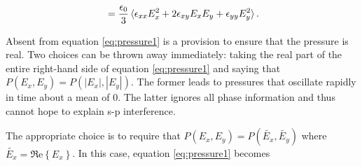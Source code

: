 \documentclass[aps, prl, twocolumn, groupedaddress]{revtex4-1}
\begin{document}
\begin{equation}
\begin{split}
                                                                                                                                                                                                                                                                                                                                                                                                                                                                                                                                &= \frac{\epsilon_0}{3}\braket{\epsilon_{xx}E_x^2 + 2
                                                                                                                                                                                                                                                                                                                                                                                                                                                                                                                                  \epsilon_{xy}E_xE_y + \epsilon_{yy}E_y^2} \mathrm{.}\\
  \end{split}
\end{equation}


Absent from equation
\ref{eq:pressure1} is a provision to ensure that the pressure is real.
Two choices can be thrown away immediately: taking the real part of
the entire right-hand side of equation \ref{eq:pressure1} and saying
that $P(E_x,E_y)=P(|E_x|,|E_y|)$. The former leads to pressures that
oscillate rapidly in time about a mean of 0. The latter ignores all
phase information and thus cannot hope to explain s-p interference.

The appropriate choice is to require that
$P(E_x,E_y)=P(\tilde{E_x},\tilde{E_y})$ where
$\tilde{E_x}=\Re\mathrm{e}\left\{E_x\right\}$. In this
case,
equation \ref{eq:pressure1} becomes
\end{document}
